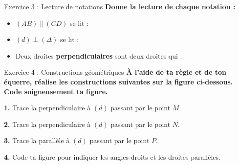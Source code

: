 \documentclass[11pt,a4paper]{article}
\begin{document}
\begin{exercisebox}{ Exercice 3 : Lecture de notations }
\textbf{Donne la lecture de chaque notation :}

\smallspace

\begin{itemize}[label=$\bullet$,leftmargin=*]
\item $(AB) \parallel (CD)$ se lit : \dotline{9cm}

\vspace{0.3cm}

\item $(d) \perp (\Delta)$ se lit : \dotline{9cm}

\vspace{0.3cm}

\item Deux droites \textbf{perpendiculaires} sont deux droites qui :

\dotline{12cm}
\end{itemize}
\end{exercisebox}

\smallspace

\begin{constructionbox}{ Exercice 4 : Constructions géométriques }
\textbf{À l'aide de ta règle et de ton équerre, réalise les constructions suivantes sur la figure ci-dessous.\\
Code soigneusement ta figure.}

\figureespace{0.5cm}

\begin{center}
\end{center}

\exspace

\textbf{1.} Trace la perpendiculaire à $(d)$ passant par le point $M$. 

\exspace

\textbf{2.} Trace la perpendiculaire à $(d)$ passant par le point $N$. 

\exspace

\textbf{3.} Trace la parallèle à $(d)$ passant par le point $P$. 

\exspace

\textbf{4.} Code ta figure pour indiquer les angles droits et les droites parallèles. 
\end{constructionbox}
\end{document}
